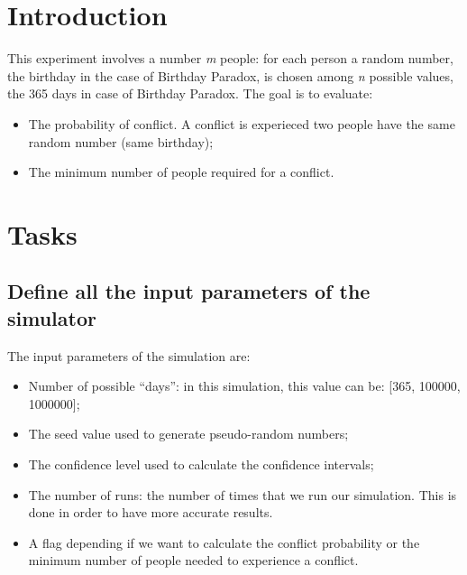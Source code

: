 \documentclass{report}
\begin{document}
	 \section{Introduction}
	 
	This experiment involves a number \emph{m} people: for each person a random number, the birthday in the case of Birthday Paradox, is chosen among \emph{n} possible values, the 365 days in case of Birthday Paradox. The goal is to evaluate:
	\begin{itemize}
		\item The probability of conflict. A conflict is experieced two people have the same random number (same birthday);
		\item The minimum number of people required for a conflict.
	\end{itemize}

	\section{Tasks}
	 
		\subsection{Define all the input parameters of the simulator}
			The input parameters of the simulation are:
			\begin{itemize}
				\item Number of possible ``days'': in this simulation, this value can be: [365, 100000, 1000000];
				\item The seed value used to generate pseudo-random numbers;
				\item The confidence level used to calculate the confidence intervals;
				\item The number of runs: the number of times that we run our simulation. This is done in order to have more accurate results.
				\item A flag depending if we want to calculate the conflict probability or the minimum number of people needed to experience a conflict.
			\end{itemize}
			 
\end{document}
